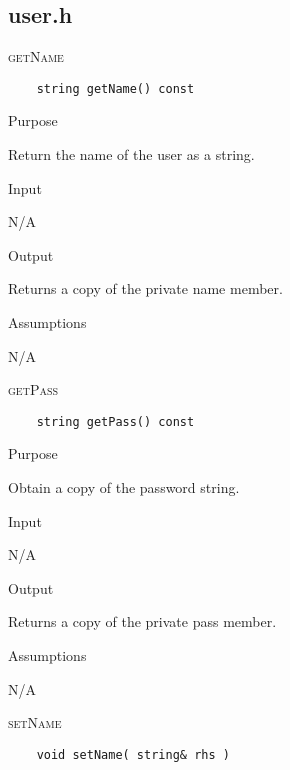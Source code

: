 \documentclass[pdftex, 12pt]{article}
\begin{document}
\subsection{user.h}
\begin{description}
	\item{\textsc{getName}}
\begin{lstlisting}
	string getName() const
\end{lstlisting}
		\begin{description}

			\item{Purpose}
			
				Return the name of the user as a string.

			\item{Input}

				N/A

			\item{Output}
			
				Returns a copy of the private name member.

			\item{Assumptions}

				N/A

		\end{description}
	\item{\textsc{getPass}}
\begin{lstlisting}
	string getPass() const
\end{lstlisting}
		\begin{description}

			\item{Purpose}

				Obtain a copy of the password string.

			\item{Input}

				N/A

			\item{Output}

				Returns a copy of the private pass member.

			\item{Assumptions}

				N/A

		\end{description}
	\item{\textsc{setName}}
\begin{lstlisting}
	void setName( string& rhs )
\end{lstlisting}
		\begin{description}


\end{description}
\end{description}
\end{document}
